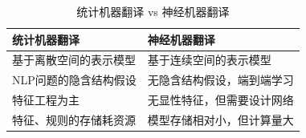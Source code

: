 \begin{table}[htp]
\centering
\caption{统计机器翻译 vs 神经机器翻译}
\label{tab:10-4}
\begin{tabular}{ l | l }
  \rule{0pt}{15pt}  \parbox{12em}{统计机器翻译		}	&神经机器翻译\\ \hline
	  \rule{0pt}{13pt}  基于离散空间的表示模型			&基于连续空间的表示模型 \\
	  \rule{0pt}{13pt} NLP问题的隐含结构假设			&无隐含结构假设，端到端学习 \\
	  \rule{0pt}{13pt} 特征工程为主					&无显性特征，但需要设计网络 \\
	  \rule{0pt}{13pt} 特征、规则的存储耗资源			&模型存储相对小，但计算量大 \\
\end{tabular}
\end{table}


